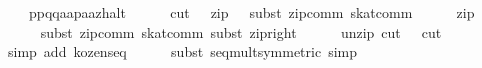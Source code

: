 \begin{isabellebody}
\ \ \ \ {}p{}{}{}p{}{}{}q{}{}{}{}q{}{}{}{}a{}{}{}{}a{}{}p{}{}{}a{}{}a{}{}z{}{}halt{}{}\isanewline
\ \ \ \ \isamarkupfalse%
\ {}cut\ {}\ {}{}\ zip\ {}\ {}{}\ subst\ zip{}comm{}\ skat{}comm{}\isanewline
\ \ \ \ \isamarkupfalse%
\ {}zip\ {}\ {}{}\isanewline
\ \ \ \ \isamarkupfalse%
\ {}subst\ zip{}comm{}\ skat{}comm{}\ subst\ zip{}right{}{}\isanewline
\ \ \ \ \isamarkupfalse%
\ {}unzip{}{}\ cut\ {}\ {}{}\ cut\ {}\ {}{}\isanewline
\ \ \ \ \isamarkupfalse%
\ {}simp\ add{}\ kozen{}{}seq{}\isanewline
\ \ \ \ \isamarkupfalse%
\ {}subst\ seq{}mult{}symmetric{}{}\ simp{}{}\isanewline

\end{isabellebody}
